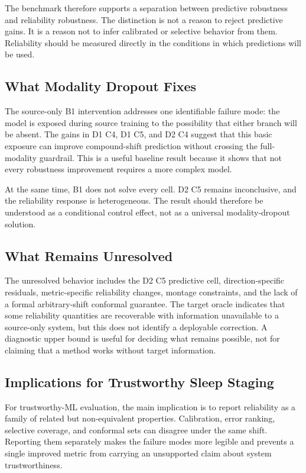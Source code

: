 \documentclass[11pt]{article}
\begin{document}
The benchmark therefore supports a separation between predictive robustness and reliability robustness. The distinction is not a reason to reject predictive gains. It is a reason not to infer calibrated or selective behavior from them. Reliability should be measured directly in the conditions in which predictions will be used.

\subsection{What Modality Dropout Fixes}
The source-only B1 intervention addresses one identifiable failure mode: the model is exposed during source training to the possibility that either branch will be absent. The gains in D1 C4, D1 C5, and D2 C4 suggest that this basic exposure can improve compound-shift prediction without crossing the full-modality guardrail. This is a useful baseline result because it shows that not every robustness improvement requires a more complex model.

At the same time, B1 does not solve every cell. D2 C5 remains inconclusive, and the reliability response is heterogeneous. The result should therefore be understood as a conditional control effect, not as a universal modality-dropout solution.

\subsection{What Remains Unresolved}
The unresolved behavior includes the D2 C5 predictive cell, direction-specific residuals, metric-specific reliability changes, montage constraints, and the lack of a formal arbitrary-shift conformal guarantee. The target oracle indicates that some reliability quantities are recoverable with information unavailable to a source-only system, but this does not identify a deployable correction. A diagnostic upper bound is useful for deciding what remains possible, not for claiming that a method works without target information.

\subsection{Implications for Trustworthy Sleep Staging}
For trustworthy-ML evaluation, the main implication is to report reliability as a family of related but non-equivalent properties. Calibration, error ranking, selective coverage, and conformal sets can disagree under the same shift. Reporting them separately makes the failure modes more legible and prevents a single improved metric from carrying an unsupported claim about system trustworthiness.
\end{document}
